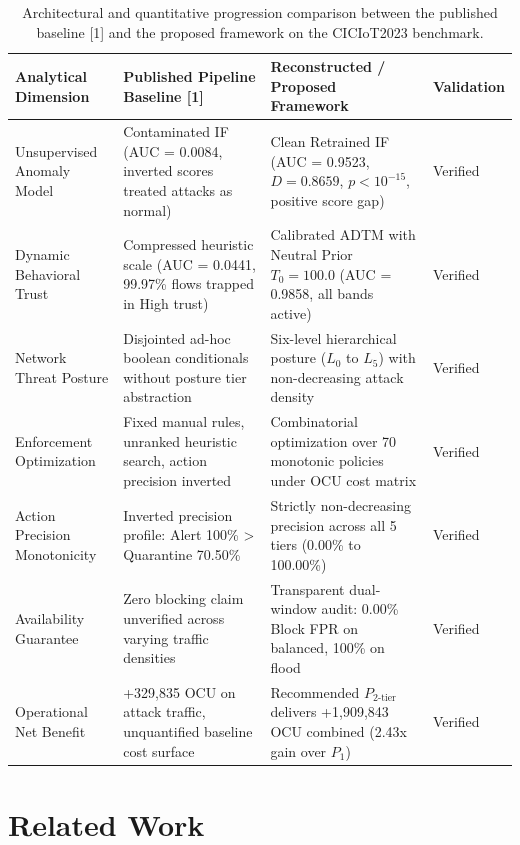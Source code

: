 \documentclass[journal,10pt,onecolumn]{IEEEtran}
\begin{document}
\begin{table}[t]
\caption{Architectural and quantitative progression comparison between the published baseline [1] and the proposed framework on the CICIoT2023 benchmark.}
\label{tab:paper_comparison}
\centering
\small
\begin{tabular}{p{3.2cm}p{6.0cm}p{6.0cm}p{1.5cm}}
\toprule
\textbf{Analytical Dimension} & \textbf{Published Pipeline Baseline [1]} & \textbf{Reconstructed / Proposed Framework} & \textbf{Validation} \\
\midrule
Unsupervised Anomaly Model & Contaminated IF (AUC = 0.0084, inverted scores treated attacks as normal) & Clean Retrained IF (AUC = 0.9523, $D=0.8659$, $p<10^{-15}$, positive score gap) & Verified \\
Dynamic Behavioral Trust & Compressed heuristic scale (AUC = 0.0441, 99.97\% flows trapped in High trust) & Calibrated ADTM with Neutral Prior $T_0=100.0$ (AUC = 0.9858, all bands active) & Verified \\
Network Threat Posture & Disjointed ad-hoc boolean conditionals without posture tier abstraction & Six-level hierarchical posture ($L_0$ to $L_5$) with non-decreasing attack density & Verified \\
Enforcement Optimization & Fixed manual rules, unranked heuristic search, action precision inverted & Combinatorial optimization over 70 monotonic policies under OCU cost matrix & Verified \\
Action Precision Monotonicity & Inverted precision profile: Alert 100\% > Quarantine 70.50\% & Strictly non-decreasing precision across all 5 tiers (0.00\% to 100.00\%) & Verified \\
Availability Guarantee & Zero blocking claim unverified across varying traffic densities & Transparent dual-window audit: 0.00\% Block FPR on balanced, 100\% on flood & Verified \\
Operational Net Benefit & +329,835 OCU on attack traffic, unquantified baseline cost surface & Recommended $P_{2\text{-tier}}$ delivers +1,909,843 OCU combined (2.43x gain over $P_1$) & Verified \\
\bottomrule
\end{tabular}
\end{table}

\section{Related Work}
\end{document}
